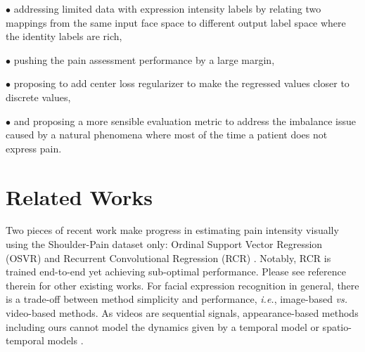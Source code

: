 \documentclass{article}
\begin{document}
\noindent $\bullet$ addressing limited data with expression intensity labels by relating two mappings from the same input face space to different output label space where the identity labels are rich,

\noindent $\bullet$ pushing the pain assessment performance by a large margin,

\noindent $\bullet$ proposing to add center loss regularizer to make the regressed values closer to discrete values,

\noindent $\bullet$ and proposing a more sensible evaluation metric to address the imbalance issue caused by a natural phenomena where most of the time a patient does not express pain.


\section{Related Works}\label{sec:related}
Two pieces of recent work make progress in estimating pain intensity visually using the Shoulder-Pain dataset only: Ordinal Support Vector Regression (OSVR) \cite{Zhao_2016_CVPR} and Recurrent Convolutional Regression (RCR) \cite{zhou2016recurrent}. Notably, RCR \cite{zhou2016recurrent} is trained end-to-end yet achieving sub-optimal performance. Please see reference therein for other existing works.
For facial expression recognition in general, there is a trade-off between method simplicity and performance,
\emph{i.e.}, image-based \cite{ding2016facenet2expnet,fabian2016emotionet} \emph{vs.} video-based \cite{Dapogny_2015_ICCV,liu2014learning,wang2013capturing,guo2012dynamic} methods.
As videos are sequential signals, appearance-based methods including ours cannot model the dynamics given by a temporal model \cite{Dapogny_2015_ICCV} or spatio-temporal models \cite{liu2014learning,wang2013capturing,guo2012dynamic}. 

\end{document}

